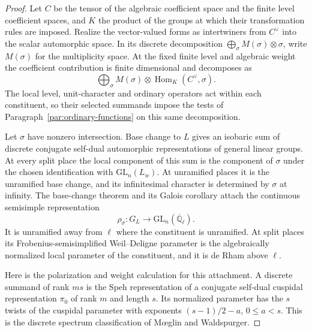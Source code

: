 \begin{proof}
Let \(C\) be the tensor of the algebraic coefficient space and
the finite level coefficient spaces, and \(K\) the product of
the groups at which their transformation rules are imposed.
Realize the vector-valued forms as intertwiners from \(C^\vee\)
into the scalar automorphic space. In its discrete decomposition
\(\bigoplus_\sigma M(\sigma)\otimes\sigma\), write \(M(\sigma)\)
for the multiplicity space. At the fixed finite level and
algebraic weight the coefficient contribution is finite
dimensional and decomposes as
\[
 \bigoplus_\sigma M(\sigma)\otimes
                 \operatorname{Hom}_{K}(C^\vee,\sigma).
\]
The local level, unit-character and ordinary operators act
within each constituent, so their selected summands impose
the tests of Paragraph~\ref{par:ordinary-functions} on this
same decomposition.
\cite[Lemma 1.25]{newton-thorne-unitary}

Let \(\sigma\) have nonzero intersection. Base change to \(L\)
gives an isobaric sum of discrete conjugate self-dual automorphic
representations of general linear groups. At every split place
the local component of this sum is the component of \(\sigma\)
under the chosen identification with \(\mathrm{GL}_n(L_w)\).
At unramified places it is the unramified base change, and its
infinitesimal character is determined by \(\sigma\) at infinity.
The base-change theorem and its Galois corollary attach the continuous semisimple representation
\[
 \rho_\sigma:G_L\longrightarrow\mathrm{GL}_n(\overline{\mathbb Q}_\ell).
\] It is unramified away from \(\ell\)
where the constituent is unramified. At split places its
Frobenius-semisimplified Weil--Deligne parameter is the
algebraically normalized local parameter of the constituent,
and it is de Rham above \(\ell\).
\cite[Theorem 1.2 and Corollary 1.3]{newton-thorne-unitary}

Here is the polarization and weight calculation for this
attachment. A discrete summand of rank \(m s\) is the Speh
representation of a conjugate self-dual cuspidal representation
\(\pi_0\) of rank \(m\) and length \(s\). Its normalized parameter
has the \(s\) twists of the cuspidal parameter with exponents
\((s-1)/2-a\), \(0\le a<s\). This is the discrete spectrum
classification of M{\oe}glin and Waldspurger.


\end{proof}
